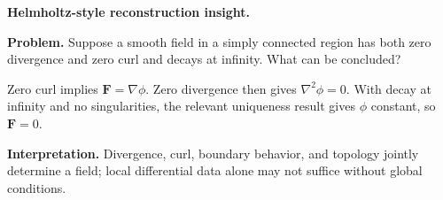 \begin{workedexample}
\textbf{Helmholtz-style reconstruction insight.}\par
\textbf{Problem.} Suppose a smooth field in a simply connected region has both zero divergence and zero curl and decays at infinity. What can be concluded?
\begin{solution}
Zero curl implies $\mathbf F=\nabla\phi$. Zero divergence then gives $\nabla^2\phi=0$. With decay at infinity and no singularities, the relevant uniqueness result gives $\phi$ constant, so $\mathbf F=0$.

\textbf{Interpretation.} Divergence, curl, boundary behavior, and topology jointly determine a field; local differential data alone may not suffice without global conditions.
\end{solution}
\end{workedexample}
